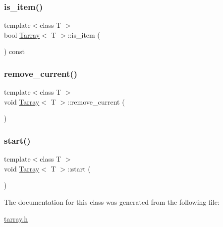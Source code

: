 \hypertarget{class_tarray_ab4047d306cc681cee5b665f0cca887f1}{}\label{class_tarray_ab4047d306cc681cee5b665f0cca887f1} 
\subsubsection{\texorpdfstring{is\+\_\+item()}{is\_item()}}
{\footnotesize\ttfamily template$<$class T $>$ \\
bool \hyperlink{class_tarray}{Tarray}$<$ T $>$\+::is\+\_\+item (\begin{DoxyParamCaption}{ }\end{DoxyParamCaption}) const}

\hypertarget{class_tarray_af1728e8ed47a8de0fd3eedfa526b0c43}{}\label{class_tarray_af1728e8ed47a8de0fd3eedfa526b0c43} 
\subsubsection{\texorpdfstring{remove\+\_\+current()}{remove\_current()}}
{\footnotesize\ttfamily template$<$class T $>$ \\
void \hyperlink{class_tarray}{Tarray}$<$ T $>$\+::remove\+\_\+current (\begin{DoxyParamCaption}{ }\end{DoxyParamCaption})}

\hypertarget{class_tarray_afdf48d2a03b6b1c110818998b6a86a38}{}\label{class_tarray_afdf48d2a03b6b1c110818998b6a86a38} 
\subsubsection{\texorpdfstring{start()}{start()}}
{\footnotesize\ttfamily template$<$class T $>$ \\
void \hyperlink{class_tarray}{Tarray}$<$ T $>$\+::start (\begin{DoxyParamCaption}{ }\end{DoxyParamCaption})}



The documentation for this class was generated from the following file\+:\begin{DoxyCompactItemize}
\item 
\hyperlink{tarray_8h}{tarray.\+h}\end{DoxyCompactItemize}
